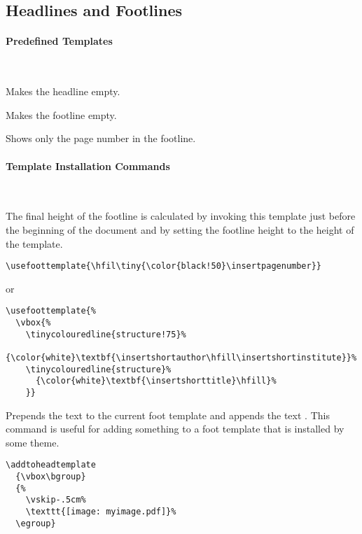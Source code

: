\subsection{Headlines and Footlines}

\label{section-head-templates}

\paragraph{Predefined Templates}\ 

\begin{command}{\beamertemplateheadempty}
  Makes the headline empty.
\end{command}

\begin{command}{\beamertemplatefootempty}
  Makes the footline empty.
\end{command}

\begin{command}{\beamertemplatefootpagenumber}
  Shows only the page number in the footline.
\end{command}



\paragraph{Template Installation Commands}\ 

\begin{command}{\usefoottemplate{}}
  The final height of the footline is calculated by invoking this
  template just before the beginning of the document and by setting
  the footline height to the height of the template.
  \example
\begin{verbatim}
\usefoottemplate{\hfil\tiny{\color{black!50}\insertpagenumber}}
\end{verbatim}
or
\begin{verbatim}
\usefoottemplate{%
  \vbox{%
    \tinycolouredline{structure!75}%
      {\color{white}\textbf{\insertshortauthor\hfill\insertshortinstitute}}%
    \tinycolouredline{structure}%
      {\color{white}\textbf{\insertshorttitle}\hfill}%
    }}
\end{verbatim}
\end{command}

\begin{command}{\addtofoottemplate{}}
  Prepends the text  to the current foot template and
  appends the text . This command is useful for adding
  something to a foot template that is installed by some theme.
  \example
\begin{verbatim}
\addtoheadtemplate
  {\vbox\bgroup}
  {%
    \vskip-.5cm%
    \texttt{[image: myimage.pdf]}%
  \egroup}
\end{verbatim}
\end{command}


